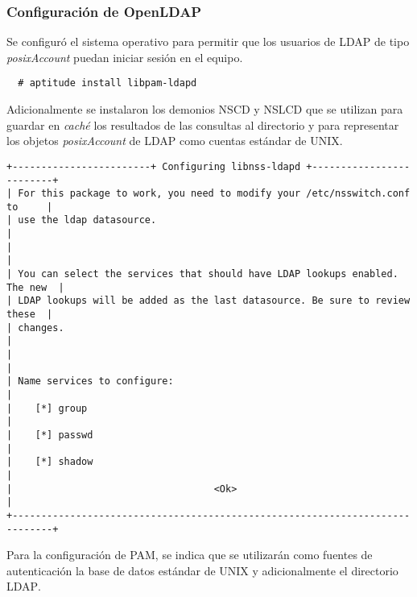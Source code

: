           \subsubsection {Configuraci\'{o}n de \textup{OpenLDAP}}

Se configur\'{o} el sistema operativo para permitir que los usuarios de \textsc{\gls{LDAP}} de tipo \textit{posixAccount} puedan iniciar sesi\'{o}n en el equipo.

{
\scriptsize
\linespread{1}
\begin{verbatim}
  # aptitude install libpam-ldapd
\end{verbatim}
}

Adicionalmente se instalaron los demonios \textsc{NSCD} y \textsc{NSLCD} que se utilizan para guardar en \textit{cach\'{e}} los resultados de las consultas al directorio y para representar los objetos \textit{posixAccount} de \textsc{\gls{LDAP}} como cuentas est\'{a}ndar de \textsc{UNIX}.

{
\scriptsize
\linespread{1}
\begin{verbatim}
+------------------------+ Configuring libnss-ldapd +-------------------------+
| For this package to work, you need to modify your /etc/nsswitch.conf to     |
| use the ldap datasource.                                                    |
|                                                                             |
| You can select the services that should have LDAP lookups enabled. The new  |
| LDAP lookups will be added as the last datasource. Be sure to review these  |
| changes.                                                                    |
|                                                                             |
| Name services to configure:                                                 |
|    [*] group                                                                |
|    [*] passwd                                                               |
|    [*] shadow                                                               |
|                                   <Ok>                                      |
+-----------------------------------------------------------------------------+
\end{verbatim}
}

Para la configuraci\'{o}n de \textsc{\gls{PAM}}, se indica que se utilizar\'{a}n como fuentes de autenticaci\'{o}n la base de datos est\'{a}ndar de UNIX y adicionalmente el directorio \textsc{\gls{LDAP}}.

